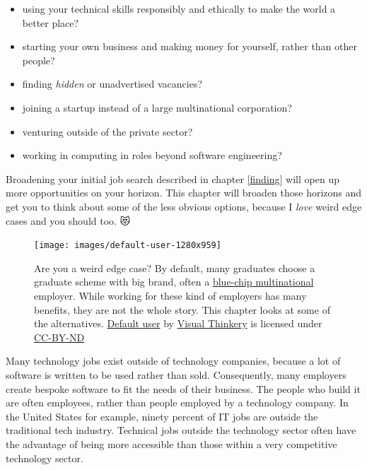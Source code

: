 \documentclass[
]{book}
\providecommand{\tightlist}{%
  \setlength{\itemsep}{0pt}\setlength{\parskip}{0pt}}
\begin{document}
\begin{itemize}
\tightlist
\item
  using your technical skills responsibly and ethically to make the world a better place?
\item
  starting your own business and making money for yourself, rather than other people?
\item
  finding \emph{hidden} or unadvertised vacancies?
\item
  joining a startup instead of a large multinational corporation?
\item
  venturing outside of the private sector?
\item
  working in computing in roles beyond software engineering?
\end{itemize}

Broadening your initial job search described in chapter \ref{finding} will open up more opportunities on your horizon. This chapter will broaden those horizons and get you to think about some of the less obvious options, because I \emph{love} weird edge cases and you should too. 😻

\begin{figure}

{\centering \texttt{[image: images/default-user-1280x959]} 

}

\caption{Are you a weird edge case? By default, many graduates choose a graduate scheme with big brand, often a \href{https://en.wikipedia.org/wiki/Blue_chip_(stock_market)}{blue-chip multinational} employer. While working for these kind of employers has many benefits, they are not the whole story. This chapter looks at some of the alternatives. \href{https://bryanmmathers.com/default-user/}{Default user} by \href{https://visualthinkery.com}{Visual Thinkery} is licensed under \href{https://creativecommons.org/licenses/by-nd/4.0/}{CC-BY-ND}}\label{fig:default-user-fig}
\end{figure}



Many technology jobs exist outside of technology companies, \citep{outsideit} because a lot of software is written to be used rather than sold. Consequently, many employers create bespoke software to fit the needs of their business. The people who build it are often employees, rather than people employed by a technology company. In the United States for example, ninety percent of IT jobs are outside the traditional tech industry. Technical jobs outside the technology sector often have the advantage of being more accessible than those within a very competitive technology sector. \citep{burninglass}
\end{document}
